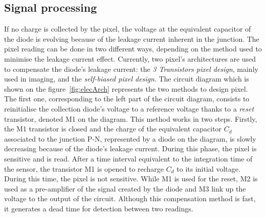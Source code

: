     \subsection{Signal processing}

    If no charge is collected by the pixel, the voltage at the equivalent capacitor of the diode is evolving because of the leakage current inherent in the junction.
    The pixel reading can be done in two different ways, depending on the method used to minimise the leakage current effect.
    Currently, two pixel's architectures are used to compensate the diode's leakage current: the \textit{3 Transistors pixel design}, mainly used in imaging, and the \textit{self-biased pixel design}.
    The circuit diagram which is shown on the figure~\ref{fig:elecArch} represents the two methods to design pixel.
    The first one, corresponding to the left part of the circuit diagram, consists to reinitialise the collection diode's voltage to a reference voltage thanks to a \textit{reset} transistor, denoted M1 on the diagram.
    This method works in two steps. 
    Firstly, the M1 transistor is closed and the charge of the equivalent capacitor $C_d$ associated to the junction P-N, represented by a diode on the diagram, is slowly decreasing because of the diode's leakage current. 
    During this phase, the pixel is sensitive and is read.
    After a time interval equivalent to the integration time of the sensor, the transistor M1 is opened to recharge $C_d$ to its initial voltage.
    During this time, the pixel is not sensitive.
    While M1 is used for the reset, M2 is used as a pre-amplifier of the signal created by the diode and M3 link up the voltage to the output of the circuit.
    Although this compensation method is fast, it generates a dead time for detection between two readings.
    
    
